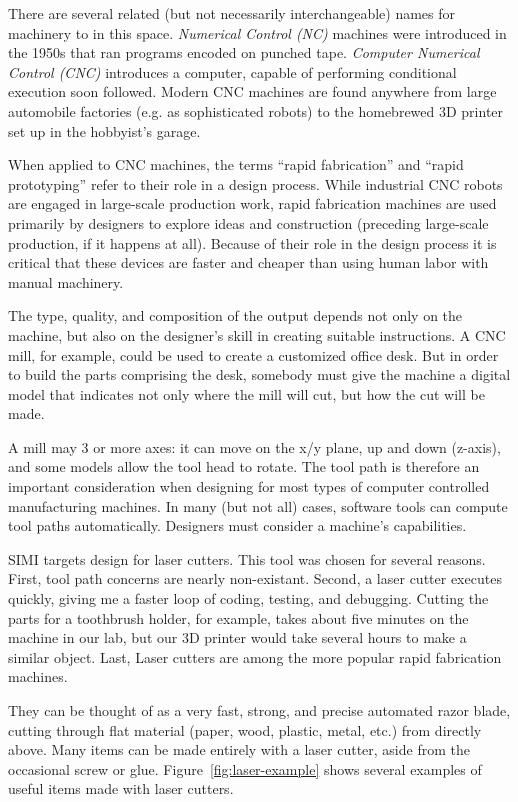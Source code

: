 There are several related (but not necessarily interchangeable) names
for machinery to in this space. \textit{Numerical Control (NC)}
machines were introduced in the 1950s that ran programs encoded on
punched tape. \textit{Computer Numerical Control (CNC)} introduces a
computer, capable of performing conditional execution soon
followed. Modern CNC machines are found anywhere from large automobile
factories (e.g. as sophisticated robots) to the homebrewed 3D printer
set up in the hobbyist's garage.

When applied to CNC machines, the terms ``rapid fabrication'' and
``rapid prototyping'' refer to their role in a design process. While
industrial CNC robots are engaged in large-scale production work,
rapid fabrication machines are used primarily by designers to explore
ideas and construction (preceding large-scale production, if it
happens at all). Because of their role in the design process it is
critical that these devices are faster and cheaper than using human
labor with manual machinery.

The type, quality, and composition of the output depends not only on
the machine, but also on the designer's skill in creating suitable
instructions. A CNC mill, for example, could be used to create a
customized office desk. But in order to build the parts comprising the
desk, somebody must give the machine a digital model that indicates
not only where the mill will cut, but how the cut will be made.

A mill may 3 or more axes: it can move on the x/y plane, up and down
(z-axis), and some models allow the tool head to rotate. The tool path
is therefore an important consideration when designing for most types
of computer controlled manufacturing machines. In many (but not all)
cases, software tools can compute tool paths automatically. Designers
must consider a machine's capabilities.

SIMI targets design for laser cutters. This tool was chosen for
several reasons. First, tool path concerns are nearly
non-existant. Second, a laser cutter executes quickly, giving me a
faster loop of coding, testing, and debugging. Cutting the parts for a
toothbrush holder, for example, takes about five minutes on the
machine in our lab, but our 3D printer would take several hours to
make a similar object. Last, Laser cutters are among the more popular
rapid fabrication machines.

They can be thought of as a very fast, strong, and precise
automated razor blade, cutting through flat material (paper, wood,
plastic, metal, etc.) from directly above. Many items can be made
entirely with a laser cutter, aside from the occasional screw or
glue. Figure~\ref{fig:laser-example} shows several examples of useful
items made with laser cutters. %

